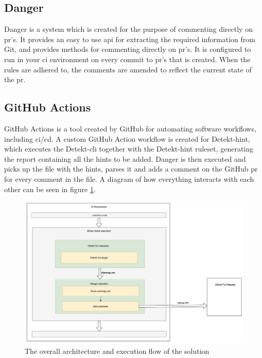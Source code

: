 \documentclass{report}
\begin{document}
\subsection{Danger}
Danger is a system which is created for the purpose of commenting directly on \gls{pr}'s. It provides an easy to use \gls{api} for extracting the required information from Git, and provides methods for commenting directly on \gls{pr}'s. It is configured to run in your \gls{ci} environment on every commit to \gls{pr}'s that is created. When the rules are adhered to, the comments are amended to reflect the current state of the \gls{pr}. 

\subsection{GitHub Actions}
GitHub Actions is a tool created by GitHub for automating software workflows, including \gls{ci}/\gls{cd}. A custom GitHub Action workflow is created for Detekt-hint, which executes the Detekt-\gls{cli} together with the Detekt-hint ruleset, generating the report containing all the hints to be added. Danger is then executed and picks up the file with the hints, parses it and adds a comment on the GitHub \gls{pr} for every comment in the file. A diagram of how everything interacts with each other can be seen in figure \ref{fig:integration}. 


\begin{figure}
    \centering
    \includegraphics[width=\textwidth]{images/detekt-hint-execution.png}
    \caption{The overall architecture and execution flow of the solution}
    \label{fig:integration}
\end{figure}
\end{document}
